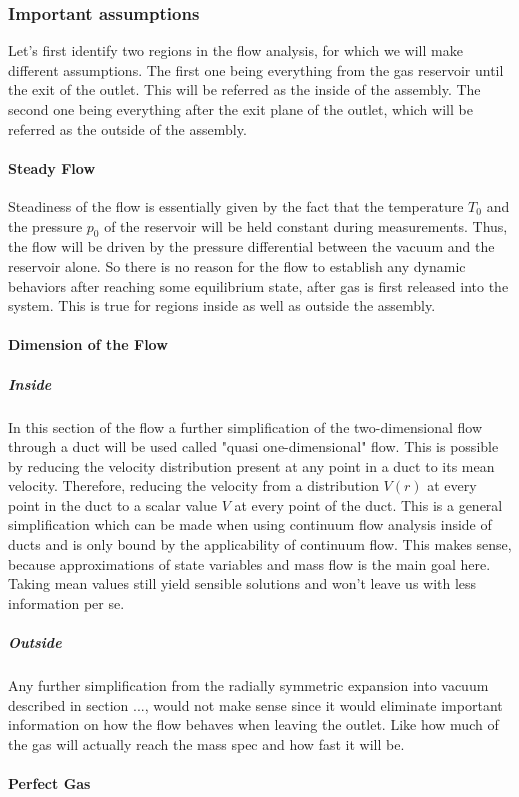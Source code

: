 \subsubsection{Important assumptions}
Let's first identify two regions in the flow analysis, for which we will make different assumptions. The first one being everything from the gas reservoir until the exit of the outlet. This will be referred as the inside of the assembly. The second one being everything after the exit plane of the outlet, which will be referred as the outside of the assembly. 
\paragraph{Steady Flow}
Steadiness of the flow is essentially given by the fact that the temperature $T_0$ and the pressure $p_0$ of the reservoir will be held constant during measurements. Thus, the flow will be driven by the pressure differential between the vacuum and the reservoir alone. So there is no reason for the flow to establish any dynamic behaviors after reaching some equilibrium state, after gas is first released into the system. This is true for regions inside as well as outside the assembly.
\paragraph{Dimension of the Flow}
\subparagraph{Inside}
In this section of the flow a further simplification of the two-dimensional flow through a duct will be used called "quasi one-dimensional" flow. This is possible by reducing the velocity distribution present at any point in a duct to its mean velocity. Therefore, reducing the velocity from a distribution $V(r)$ at every point in the duct to a scalar value $V$ at every point of the duct. This is a general simplification which can be made when using continuum flow analysis inside of ducts and is only bound by the applicability of continuum flow. This makes sense, because approximations of state variables and mass flow is the main goal here. Taking mean values still yield sensible solutions and won't leave us with less information per se.
\subparagraph{Outside}
Any further simplification from the radially symmetric expansion into vacuum described in section ..., would not make sense since it would eliminate important information on how the flow behaves when leaving the outlet. Like how much of the gas will actually reach the mass spec and how fast it will be.
\paragraph{Perfect Gas}

